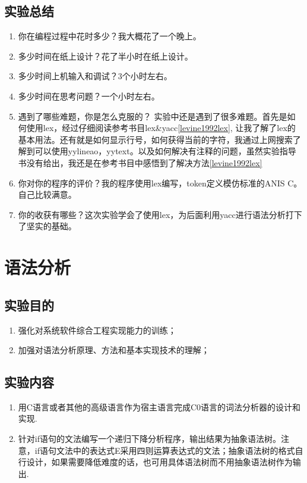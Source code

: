 \documentclass{article}
\begin{document}
\begin{CJK}{UTF8}{gkai}
\subsection{实验总结}
\begin{enumerate}
\item 你在编程过程中花时多少？我大概花了一个晚上。
\item  多少时间在纸上设计？花了半小时在纸上设计。
\item  多少时间上机输入和调试？3个小时左右。
\item  多少时间在思考问题？一个小时左右。
\item  遇到了哪些难题，你是怎么克服的？ 实验中还是遇到了很多难题。首先是如何使用lex，经过仔细阅读参考书目lex\&yacc\ref{levine1992lex}, 让我了解了lex的基本用法。还有就是如何显示行号，如何获得当前的字符，我通过上网搜索了解到可以使用yylineao，yytext。以及如何解决有注释的问题，虽然实验指导书没有给出，我还是在参考书目中感悟到了解决方法\ref{levine1992lex}
\item  你对你的程序的评价？我的程序使用lex编写，token定义模仿标准的ANIS C。自己比较满意。
\item  你的收获有哪些？这次实验学会了使用lex，为后面利用yacc进行语法分析打下了坚实的基础。
\end{enumerate}

\clearpage
\section{语法分析}
\subsection{实验目的}
\begin{enumerate}
	\item 强化对系统软件综合工程实现能力的训练；
	\item 加强对语法分析原理、方法和基本实现技术的理解；
\end{enumerate}

\subsection{实验内容}
\begin{enumerate}
	\item 用C语言或者其他的高级语言作为宿主语言完成C0语言的词法分析器的设计和实现.
	\item 针对if语句的文法编写一个递归下降分析程序，输出结果为抽象语法树。注意，if语句文法中的表达式E采用四则运算表达式的文法；抽象语法树的格式自行设计，如果需要降低难度的话，也可用具体语法树而不用抽象语法树作为输出.
\end{enumerate}


\end{CJK}
\end{document}
